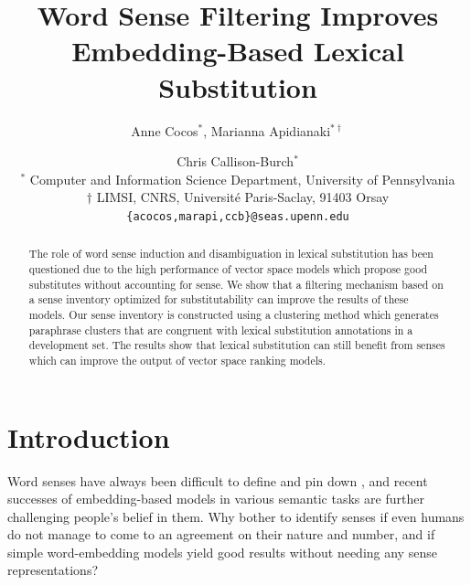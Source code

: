 \documentclass[11pt]{article}
\title{Word Sense Filtering Improves Embedding-Based Lexical Substitution} %
\author{Anne Cocos$^{*}$, Marianna Apidianaki$^{*\dag}$ \and Chris Callison-Burch$^{*}$\\
$^{*}$ Computer and Information Science Department, University of Pennsylvania \\ 
$\dag$ LIMSI, CNRS, Universit\'e Paris-Saclay, 91403 Orsay \\
{\tt \{acocos,marapi,ccb\}@seas.upenn.edu} \\}
\date{}
\begin{document}
\maketitle
\begin{abstract}

The role of word sense induction and disambiguation in lexical substitution has been questioned due to the high performance of vector space models which propose good substitutes without accounting for sense. We show that a filtering mechanism based on a sense inventory optimized for substitutability can improve the results of these models. Our sense inventory is constructed using a clustering method which generates paraphrase clusters that are congruent with lexical substitution annotations in a development set. The results show that lexical substitution can still benefit from senses which can improve the output of vector space ranking models.

\end{abstract}

\section{Introduction}

Word senses have always been difficult to define and pin down \cite{kilgarriff1997don,ErketalCL2013}, and recent successes of embedding-based models in various semantic tasks are further challenging people's belief in them. Why bother to identify senses if even humans do not manage to come to an agreement on their nature and number, and if simple word-embedding models yield good results without needing any sense representations? 
\end{document}

